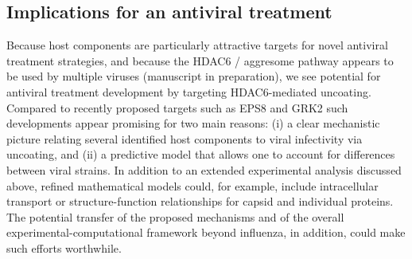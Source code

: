 \subsection{Implications for an antiviral treatment}

Because host components are particularly attractive targets for novel antiviral treatment strategies, and because the HDAC6 / aggresome pathway appears to be used by multiple viruses (manuscript in preparation), we see potential for antiviral treatment development by targeting HDAC6-mediated uncoating. Compared to recently proposed targets such as EPS8 \cite{larson2019eps8} and GRK2 \cite{yanguez2018phosphoproteomic} such developments appear promising for two main reasons: (i) a clear mechanistic picture relating several identified host components to viral infectivity via uncoating, and (ii) a predictive model that allows one to account for differences between viral strains. In addition to an extended experimental analysis discussed above, refined mathematical models could, for example, include intracellular transport or structure-function relationships for capsid and individual proteins. The potential transfer of the proposed mechanisms and of the overall experimental-computational framework beyond influenza, in addition, could make such efforts worthwhile.
